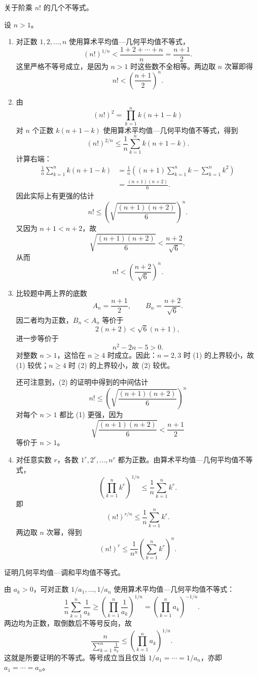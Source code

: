 \begin{xexercise}[2]
关于阶乘 $n!$ 的几个不等式。
\end{xexercise}
\begin{xsolution}
设 $n>1$。
\begin{enumerate}[label=(\arabic*)]
  \item 对正数 $1,2,\ldots,n$ 使用算术平均值—几何平均值不等式，
  \[
    (n!)^{1/n}
    <\frac{1+2+\cdots+n}{n}
    =\frac{n+1}{2}.
  \]
  这里严格不等号成立，是因为 $n>1$ 时这些数不全相等。两边取 $n$ 次幂即得
  \[
    n!<\left(\frac{n+1}{2}\right)^n.
  \]

  \item 由
  \[
    (n!)^2=\prod_{k=1}^n k(n+1-k)
  \]
  对 $n$ 个正数 $k(n+1-k)$ 使用算术平均值—几何平均值不等式，得到
  \[
    (n!)^{2/n}
    \le\frac1n\sum_{k=1}^n k(n+1-k).
  \]
  计算右端：
  \[
  \begin{aligned}
    \frac1n\sum_{k=1}^n k(n+1-k)
    &=\frac1n\left((n+1)\sum_{k=1}^n k-\sum_{k=1}^n k^2\right)\\
    &=\frac{(n+1)(n+2)}6.
  \end{aligned}
  \]
  因此实际上有更强的估计
  \[
    n!\le\left(\sqrt{\frac{(n+1)(n+2)}6}\right)^n.
  \]
  又因为 $n+1<n+2$，故
  \[
    \sqrt{\frac{(n+1)(n+2)}6}<\frac{n+2}{\sqrt6},
  \]
  从而
  \[
    n!<\left(\frac{n+2}{\sqrt6}\right)^n.
  \]

  \item 比较题中两上界的底数
  \[
    A_n=\frac{n+1}{2},\qquad B_n=\frac{n+2}{\sqrt6}.
  \]
  因二者均为正数，$B_n<A_n$ 等价于
  \[
    2(n+2)<\sqrt6(n+1),
  \]
  进一步等价于
  \[
    n^2-2n-5>0.
  \]
  对整数 $n>1$，这恰在 $n\ge4$ 时成立。因此：$n=2,3$ 时 (1) 的上界较小，故 (1) 较优；$n\ge4$ 时 (2) 的上界较小，故 (2) 较优。

  还可注意到，(2) 的证明中得到的中间估计
  \[
    n!\le\left(\sqrt{\frac{(n+1)(n+2)}6}\right)^n
  \]
  对每个 $n>1$ 都比 (1) 更强，因为
  \[
    \sqrt{\frac{(n+1)(n+2)}6}<\frac{n+1}{2}
  \]
  等价于 $n>1$。

  \item 对任意实数 $r$，各数 $1^r,2^r,\ldots,n^r$ 都为正数。由算术平均值—几何平均值不等式，
  \[
    \left(\prod_{k=1}^n k^r\right)^{1/n}
    \le\frac1n\sum_{k=1}^n k^r.
  \]
  即
  \[
    (n!)^{r/n}\le\frac1n\sum_{k=1}^n k^r.
  \]
  两边取 $n$ 次幂，得到
  \[
    (n!)^r\le\frac1{n^n}\left(\sum_{k=1}^n k^r\right)^n.
  \]
\end{enumerate}
\end{xsolution}

\begin{xexercise}[3]
证明几何平均值—调和平均值不等式。
\end{xexercise}
\begin{xsolution}
由 $a_k>0$，可对正数 $1/a_1,\ldots,1/a_n$ 使用算术平均值—几何平均值不等式：
\[
  \frac1n\sum_{k=1}^n\frac1{a_k}
  \ge
  \left(\prod_{k=1}^n\frac1{a_k}\right)^{1/n}
  =\left(\prod_{k=1}^n a_k\right)^{-1/n}.
\]
两边均为正数，取倒数后不等号反向，故
\[
  \frac{n}{\displaystyle\sum_{k=1}^n\frac1{a_k}}
  \le
  \left(\prod_{k=1}^n a_k\right)^{1/n}.
\]
这就是所要证明的不等式。等号成立当且仅当 $1/a_1=\cdots=1/a_n$，亦即 $a_1=\cdots=a_n$。
\end{xsolution}


